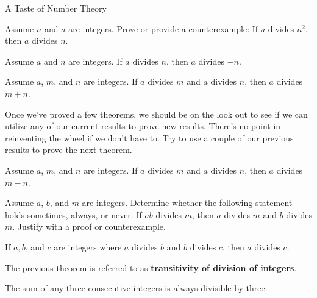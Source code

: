 \begin{section}{A Taste of Number Theory}
\begin{problem}
Assume $n$ and $a$ are integers.  Prove or provide a counterexample:  If $a$ divides $n^2$, then $a$ divides $n$.
\end{problem}

\begin{theorem}
Assume $a$ and $n$ are integers. If $a$ divides $n$, then $a$ divides $-n$. 
\end{theorem}

\begin{theorem}[*]
Assume $a$, $m$, and $n$ are integers. If $a$ divides $m$ and $a$ divides $n$, then $a$ divides $m+n$. 
\end{theorem}

Once we've proved a few theorems, we should be on the look out to see if we can utilize any of our current results to prove new results.  There's no point in reinventing the wheel if we don't have to.  Try to use a couple of our previous results to prove the next theorem.

\begin{theorem}
Assume $a$, $m$, and $n$ are integers. If $a$ divides $m$ and $a$ divides $n$, then $a$ divides $m-n$.
\end{theorem}

\begin{problem}[*]
Assume $a$, $b$, and $m$ are integers. Determine whether the following statement holds sometimes, always, or never.  If $ab$ divides $m$, then $a$ divides $m$ and $b$ divides $m$.  Justify with a proof or counterexample.
\end{problem}

\begin{theorem}[*]
If $a, b$, and $c$ are integers where $a$ divides $b$ and $b$ divides $c$, then $a$ divides $c$.
\end{theorem}

The previous theorem is referred to as \textbf{transitivity of division of integers}.

\begin{theorem}[*]
The sum of any three consecutive integers is always divisible by three.\end{theorem}

\end{section}
